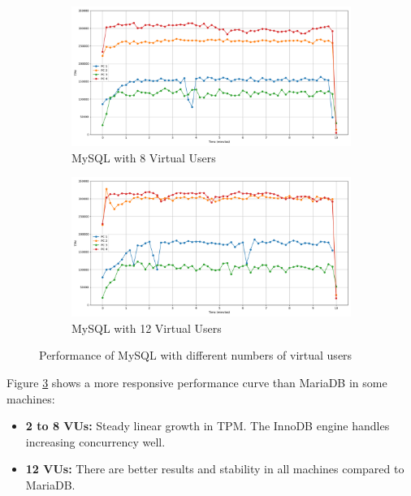 \begin{figure}[H]
    \hspace*{-1.7cm}
    \begin{subfigure}[b]{0.6\textwidth}
        \centering
        \includegraphics[width=\linewidth]{Images/hdbtcount_MySQL_8.png}
        \caption{MySQL with 8 Virtual Users}
        \label{fig:mysql-8vu}
    \end{subfigure}%
    \begin{subfigure}[b]{0.6\textwidth}
        \centering
        \includegraphics[width=\linewidth]{Images/hdbtcount_MySQL_12.png}
        \caption{MySQL with 12 Virtual Users}
        \label{fig:mysql-12vu}
    \end{subfigure}

    \caption{Performance of MySQL with different numbers of virtual users}
    \label{fig:mysql-all}
    
\end{figure}

Figure \ref{fig:mysql-all} shows a more responsive performance curve than MariaDB in some machines:

\begin{itemize}
    \setlength\itemsep{0.1em}
    \item \textbf{2 to 8 VUs:} Steady linear growth in TPM. The InnoDB engine handles increasing concurrency well.
    \item \textbf{12 VUs:} There are better results and stability in all machines compared to MariaDB.
\end{itemize}

